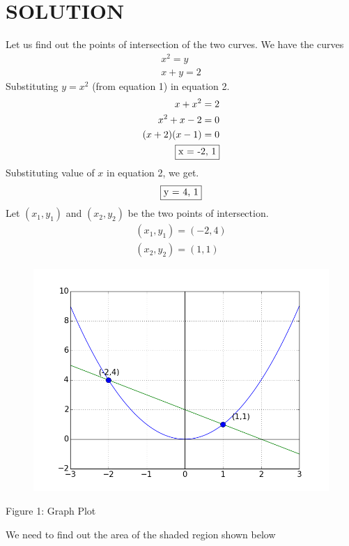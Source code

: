 \documentclass[journal,12pt,twocolumn]{IEEEtran}
\begin{document}
\section{\textbf{SOLUTION}}
Let us find out the points of intersection of the two curves. We have the curves
\begin{align}
    x^2 = y\\
    x + y = 2
\end{align}
Substituting $y = x^2$ (from equation 1) in equation 2.
\begin{align*}
    x + x^2 = 2\\
    x^2 + x - 2 = 0\\
    (x + 2)(x - 1) = 0\\
    \fbox{x = -2, 1}
\end{align*}
Substituting value of $x$ in equation 2, we get.
\begin{align*}
    \fbox{y = 4, 1}
\end{align*}
Let $(x_1,y_1)$ and $(x_2,y_2)$ be the two points of intersection.
\begin{align}
    (x_1,y_1) = (-2,4)\\
    (x_2,y_2) = (1,1)
\end{align}
\begin{figure}[H]
    \centering
    \includegraphics[width=\columnwidth]{Figures/Graph_Plot.png}
\end{figure}
\begin{center}
    Figure 1: Graph Plot
\end{center}
We need to find out the area of the shaded region shown below
\end{document}
